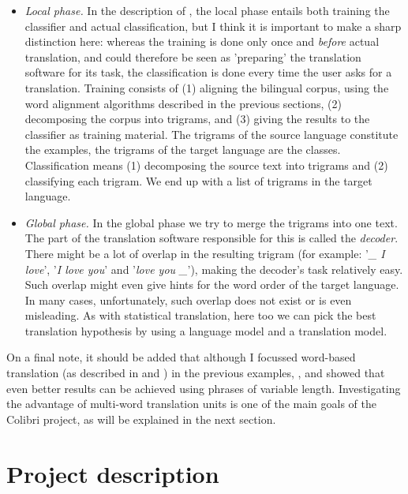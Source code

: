 \documentclass[12pt]{article}
\begin{document}
\begin{itemize}
\item \emph{Local phase.} In the description of \citet{vdbb09}, the local phase entails both training the classifier and actual classification, but I think it is important to make a sharp distinction here: whereas the training is done only once and \emph{before} actual translation, and could therefore be seen as 'preparing' the translation software for its task, the classification is done every time the user asks for a translation. Training consists of (1) aligning the bilingual corpus, using the word alignment algorithms described in the previous sections, (2) decomposing the corpus into trigrams, and (3) giving the results to the classifier as training material. The trigrams of the source language constitute the examples, the trigrams of the target language are the classes. Classification means (1) decomposing the source text into trigrams and (2) classifying each trigram. We end up with a list of trigrams in the target language.

\item \emph{Global phase.} In the global phase we try to merge the trigrams into one text. The part of the translation software responsible for this is called the \emph{decoder}. There might be a lot of overlap in the resulting trigram (for example: '\emph{\_ I love}', '\emph{I love you}' and '\emph{love you \_}'), making the decoder's task relatively easy. Such overlap might even give hints for the word order of the target language. In many cases, unfortunately, such overlap does not exist or is even misleading. As with statistical translation, here too we can pick the best translation hypothesis by using a language model and a translation model. 


\end{itemize}

On a final note, it should be added that although I focussed word-based translation (as described in \citet{stroppa07} and \citet{vdbb09}) in the previous examples,  \citet{vangompel09}, \citet{vangompelea09} and \citet{vangompel11} showed that even better results can be achieved using phrases of variable length. Investigating the advantage of multi-word translation units is one of the main goals of the Colibri project, as will be explained in the next section.





\section{Project description}
\end{document}
